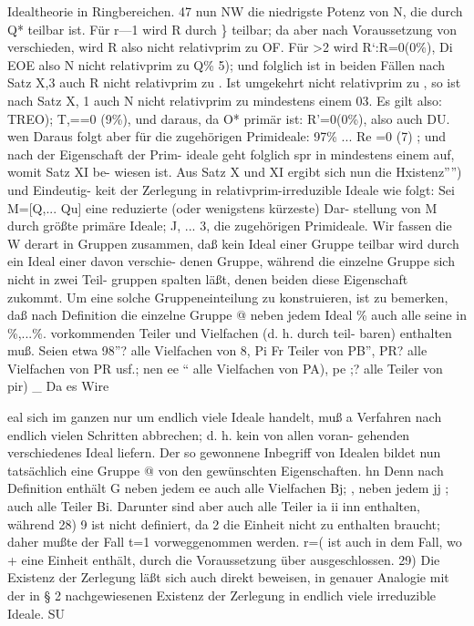 \documentclass[11pt,a4paper]{article}
\theoremstyle{plain}
\theoremstyle{definition}
\begin{document}
Idealtheorie in Ringbereichen. 
47 
nun NW die niedrigste Potenz von N, die durch Q* teilbar ist. 
Für r---1 
wird R durch \} teilbar; da aber nach Voraussetzung  von  verschieden, 
wird R also nicht relativprim zu OF. Für >2 wird R`:R=0(0\%), 
Di EOE 
also N nicht relativprim zu Q\% 5); und folglich ist in 
beiden Fällen nach Satz X,3 auch R nicht relativprim zu . 
Ist umgekehrt 
nicht relativprim 
zu , so 
ist nach 
Satz X, 1 
auch N nicht 
relativprim 
zu 
mindestens 
einem 
03. 
Es 
gilt also: 
TREO); T,==0 (9\%), und daraus, da O* primär ist: R'=0(0\%), 
also auch DU. wen 
Daraus 
folgt aber 
für 
die zugehörigen 
Primideale: 
97\% ... Re =0 (7\textdegree{}) ; und nach der Eigenschaft der Prim- 
ideale geht folglich spr in mindestens einem  auf, womit Satz XI be- 
wiesen ist. 
Aus Satz X und XI ergibt sich nun die Hxistenz'''') und Eindeutig- 
keit der Zerlegung in relativprim-irreduzible Ideale wie folgt: 
Sei M=[Q,... Qu] eine reduzierte (oder wenigstens kürzeste) Dar- 
stellung von M durch größte primäre Ideale; J, ... 3, die zugehörigen 
Primideale. 
Wir fassen die W derart in Gruppen zusammen, 
daß 
kein 
Ideal einer Gruppe teilbar wird durch ein Ideal einer davon verschie- 
denen Gruppe, während 
die einzelne Gruppe sich nicht in zwei Teil- 
gruppen spalten läßt, denen beiden diese Eigenschaft zukommt. 
Um eine 
solche 
Gruppeneinteilung 
zu 
konstruieren, 
ist zu bemerken, 
daß nach 
Definition 
die einzelne Gruppe @ neben jedem Ideal \% auch 
alle seine 
in \%,...\%. vorkommenden 
Teiler und Vielfachen 
(d. h. durch  teil- 
baren) enthalten muß. 
Seien etwa 98''? alle Vielfachen von 8, Pi Fr 
Teiler von PB'', PR? alle Vielfachen von PR usf.; nen ee `` 
alle Vielfachen von PA), pe ;? alle Teiler von pir) 
\_ 
Da es 
Wire 
 
eal 
sich im ganzen nur um endlich viele Ideale  handelt, muß a Verfahren 
nach 
endlich 
vielen 
Schritten 
abbrechen; 
d. h. kein von 
allen 
voran- 
gehenden 
verschiedenes 
Ideal 
liefern. 
Der so gewonnene 
Inbegriff von 
Idealen  bildet nun 
tatsächlich 
eine Gruppe @ von den gewünschten 
Eigenschaften. 
hn 
Denn nach Definition 
enthält G neben jedem 
ee auch alle 
Vielfachen 
Bj; , neben jedem jj ;\guillemotright{} auch 
alle Teiler Bi. 
Darunter 
sind aber auch alle Teiler ia ii inn enthalten, während 
28) 9\textdegree{} ist nicht definiert, da 2 die Einheit nicht zu enthalten braucht; daher 
mußte der Fall t=1 vorweggenommen werden. 
r=( ist auch in dem Fall, wo + 
eine Einheit enthält, durch die Voraussetzung über  ausgeschlossen. 
29) Die Existenz der Zerlegung 
läßt 
sich auch 
direkt 
beweisen, 
in genauer 
Analogie 
mit der 
in \S{} 2 nachgewiesenen Existenz 
der Zerlegung in endlich 
viele 
irreduzible Ideale. 
SU
\end{document}
